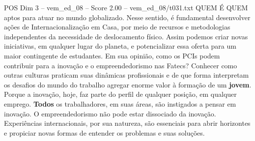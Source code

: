 \begin{textsample}{POS Dim 3 – vem\_ed\_08 – Score 2.00 – vem\_ed\_08/t031.txt}  \label{ex:f3_pos_010}
QUEM É QUEM aptos para atuar no mundo globalizado.
Nesse sentido, é fundamental desenvolver ações de Internacionalização em Casa, por meio de recursos e metodologias independentes da necessidade de deslocamento físico.
Assim podemos criar novas iniciativas, em qualquer lugar do planeta, e potencializar essa oferta para um maior contingente de estudantes.
Em sua opinião, como os PCIs podem contribuir para a inovação e o empreendedorismo nas Fatecs?
Conhecer como outras culturas praticam suas dinâmicas profissionais e de que forma interpretam os desafios do mundo do trabalho agregar enorme valor à formação de um \textbf{jovem}.
Porque a inovação, hoje, faz parte do perfil de qualquer posição, em qualquer emprego. \textbf{Todos} os trabalhadores, em suas áreas, são instigados a pensar em inovação.
O empreendedorismo não pode estar dissociado da inovação.
Experiências internacionais, por sua natureza, são essenciais para abrir horizontes e propiciar novas formas de entender os problemas e suas soluções.

\end{textsample}
